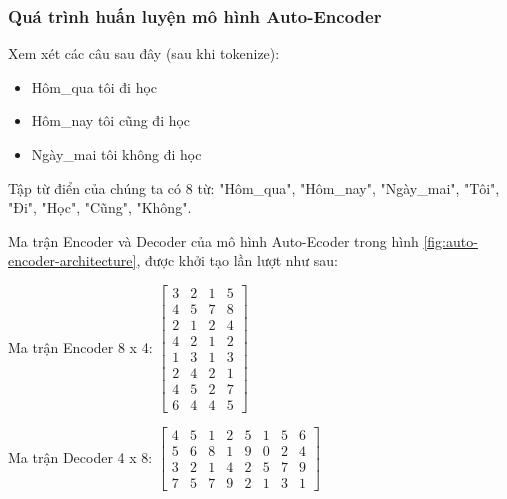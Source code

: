 \subsubsection{Quá trình huấn luyện mô hình Auto-Encoder}
Xem xét các câu sau đây (sau khi tokenize):
\begin{itemize}
    \item Hôm\_qua tôi đi học
    \item Hôm\_nay tôi cũng đi học
    \item Ngày\_mai tôi không đi học
\end{itemize}

Tập từ điển của chúng ta có 8 từ: "Hôm\_qua", "Hôm\_nay", "Ngày\_mai", "Tôi", "Đi", "Học", "Cũng", "Không". 

Ma trận Encoder và Decoder của mô hình Auto-Ecoder trong hình \ref{fig:auto-encoder-architecture}, được khởi tạo lần lượt như sau:

Ma trận Encoder 8 x 4:
$\begin{bmatrix}
 3 & 2 & 1 & 5 \\
 4 & 5 & 7 & 8 \\
 2 & 1 & 2 & 4 \\
 4 & 2 & 1 & 2 \\
 1 & 3 & 1 & 3 \\
 2 & 4 & 2 & 1 \\
 4 & 5 & 2 & 7 \\
 6 & 4 & 4 & 5 
\end{bmatrix}$

Ma trận Decoder 4 x 8:
$\begin{bmatrix}
 4 & 5 & 1 & 2 & 5 & 1 & 5 & 6 \\
 5 & 6 & 8 & 1 & 9 & 0 & 2 & 4 \\
 3 & 2 & 1 & 4 & 2 & 5 & 7 & 9 \\
 7 & 5 & 7 & 9 & 2 & 1 & 3 & 1
\end{bmatrix}$


